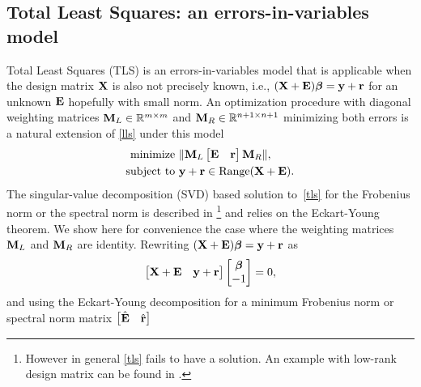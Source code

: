 \subsection{Total Least Squares: an errors-in-variables model}

Total Least Squares (TLS) is an errors-in-variables model that is applicable when the design matrix $\boldsymbol{\mathrm{X}}$ is also not precisely known,
i.e., $(\boldsymbol{\mathrm{X}} + \boldsymbol{\mathrm{E}})\boldsymbol{\mathrm{\beta}} = \boldsymbol{\mathrm{y}} + \boldsymbol{\mathrm{r}}$ for an unknown $\boldsymbol{\mathrm{E}}$ hopefully with small norm. An optimization procedure with diagonal weighting matrices $\boldsymbol{\mathrm{M}}_{L} \in \mathbb{R}^{m \times m}$ and $\boldsymbol{\mathrm{M}}_{R} \in \mathbb{R}^{n+1 \times n+1}$ minimizing both errors is a natural extension of \eqref{lls} under this model
%
\begin{equation}
\begin{aligned}
\text{minimize} &\ \| \boldsymbol{\mathrm{M}}_{L} \begin{bmatrix} \boldsymbol{\mathrm{E}} & \boldsymbol{\mathrm{r}} \end{bmatrix} \boldsymbol{\mathrm{M}}_{R} \|, \\
\text{subject to} &\ \boldsymbol{\mathrm{y}} + \boldsymbol{\mathrm{r}} \in \text{Range}(\boldsymbol{\mathrm{X}} + \boldsymbol{\mathrm{E}}).
\end{aligned}
\label{tls}
\end{equation}
%
\noindent The singular-value decomposition (SVD) based solution to~\eqref{tls} for the Frobenius norm or the spectral norm is described in \cite{Golub80} \footnote{However in general \ref{tls} fails to have a solution. An example with low-rank design matrix can be found in \cite{Golub80}.} and relies on the Eckart-Young theorem. We show here for convenience the case where the weighting matrices $\boldsymbol{\mathrm{M}}_{L}$ and $\boldsymbol{\mathrm{M}}_{R}$ are identity. Rewriting $(\boldsymbol{\mathrm{X}} + \boldsymbol{\mathrm{E}})\boldsymbol{\mathrm{\beta}} = \boldsymbol{\mathrm{y}} + \boldsymbol{\mathrm{r}}$ as  
%
\begin{equation}
\begin{aligned}
\begin{bmatrix} \boldsymbol{\mathrm{X}} + \boldsymbol{\mathrm{E}} & \boldsymbol{\mathrm{y}} + \boldsymbol{\mathrm{r}} \end{bmatrix} \begin{bmatrix} \boldsymbol{\mathrm{\beta}} \\ -1 \end{bmatrix} = 0, \\
\end{aligned}
\end{equation}
%
\noindent and using the Eckart-Young decomposition for a minimum Frobenius norm or spectral norm matrix $\begin{bmatrix} \hat{\boldsymbol{\mathrm{E}}} & \hat{\boldsymbol{\mathrm{r}}} \end{bmatrix}$%
%


